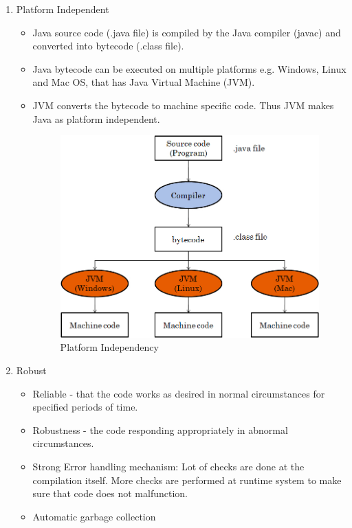 \documentclass[11pt,a4paper]{article}
\begin{document}
\begin{enumerate}
\item Platform Independent
\begin{itemize}
 \item Java source code (.java file) is compiled by the Java compiler (javac) and converted into bytecode (.class file).
 \item Java bytecode can be executed on multiple platforms e.g. Windows, Linux and Mac OS, that has Java Virtual Machine (JVM).
 \item JVM converts the bytecode to machine specific code. Thus JVM makes Java as platform independent.
\vfill{\ }
   \begin{figure}[H]
 \begin{center}
 \includegraphics[scale=0.3]{platform.jpg}
\caption{Platform Independency}
 \end{center}
 \end{figure}
 \end{itemize}

 \item Robust
\begin{itemize}
\item Reliable - that the code works as desired in normal circumstances for specified periods of time.
\item Robustness - the code responding appropriately in abnormal circumstances.
\item Strong Error handling mechanism: Lot of checks are done at the compilation itself. More checks are performed at runtime system to make sure that code does not malfunction.
\item Automatic garbage collection


\end{itemize}
\end{enumerate}
\end{document}
